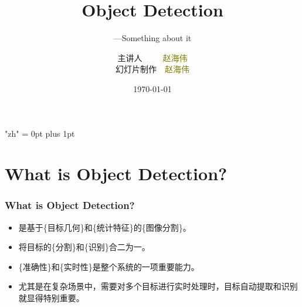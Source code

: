 \documentclass[notheorems,mathserif,table,compress]{beamer}  %
\begin{document}
\XeTeXlinebreaklocale "zh"         %
\XeTeXlinebreakskip = 0pt plus 1pt %
\begin{comment}
\AtBeginSection[]{                              %
  \frame<handout:0>{
    \frametitle{Content}\small
    \tableofcontents[current,currentsubsection]
  }
}
\AtBeginSubsection[]                            %
{
  \frame<handout:0>                             %
  {
    \frametitle{下一节内容}\small
    \tableofcontents[current,currentsubsection] %
  }
}
\end{comment}
\title[Object Detection]{Object Detection}
\subtitle{---Something about it}
\author[CVBIOUC]{主讲人~~~~~\textcolor{olive}{赵海伟}\\
    \quad 幻灯片制作~~\textcolor{olive}{赵海伟}}
\date{\today}
\frame{ \titlepage }

\section{What is Object Detection?}

\begin{frame}
  \frametitle{What is Object Detection?}  
  \begin{itemize}
  \item 是基于\{目标几何\}和\{统计特征\}的\{图像分割\}。
  \item 将目标的\{分割\}和\{识别\}合二为一。
  \item \{准确性\}和\{实时性\}是整个系统的一项重要能力。
  \item 尤其是在复杂场景中，需要对多个目标进行实时处理时，目标自动提取和识别就显得特别重要。
  \end{itemize}
\end{frame}
\end{document}
